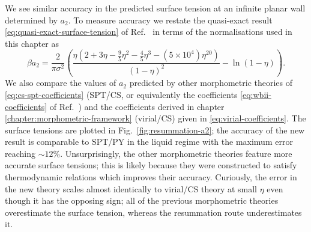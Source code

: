 \documentclass[11pt,twoside]{report}
\begin{document}
We see similar accuracy in the predicted surface tension at an infinite planar wall determined by%
$a_2$.
To measure accuracy we restate the quasi-exact result \eqref{eq:quasi-exact-surface-tension} of Ref.\ \cite{DavidchackMP2015} in terms of the normalisations used in this chapter as
\begin{equation}\label{eq:quasi-exact-surface-tension}
  \beta a_2
  =
  \frac{2}{\pi \sigma^2} \left(
  \frac{\eta (2 + 3\eta - \frac{9}{5}\eta^2 - \frac{4}{5}\eta^3 - (5 \times 10^4) \eta^{20})}{(1 - \eta)^2}
  - \ln{(1 - \eta)}
  \right).
\end{equation}
We also compare the values of $a_2$ predicted by other morphometric theories of \eqref{eq:cs-spt-coefficients} (SPT/CS, or equivalently the coefficients \eqref{eq:wbii-coefficients} of Ref.\ \cite{Hansen-GoosJPCM2006}) and the coefficients derived in chapter \ref{chapter:morphometric-framework} (virial/CS) given in \eqref{eq:virial-coefficients}.
The surface tensions are plotted in Fig.\ \ref{fig:resummation-a2}; the accuracy of the new result is comparable to SPT/PY in the liquid regime with the maximum error reaching $\sim12\%$.
Unsurprisingly, the other morphometric theories feature more accurate surface tensions; this is likely because they were constructed to satisfy thermodynamic relations which improves their accuracy.
Curiously, the error in the new theory scales almost identically to virial/CS theory at small $\eta$ even though it has the opposing sign; all of the previous morphometric theories overestimate the surface tension, whereas the resummation route underestimates it.


\end{document}
